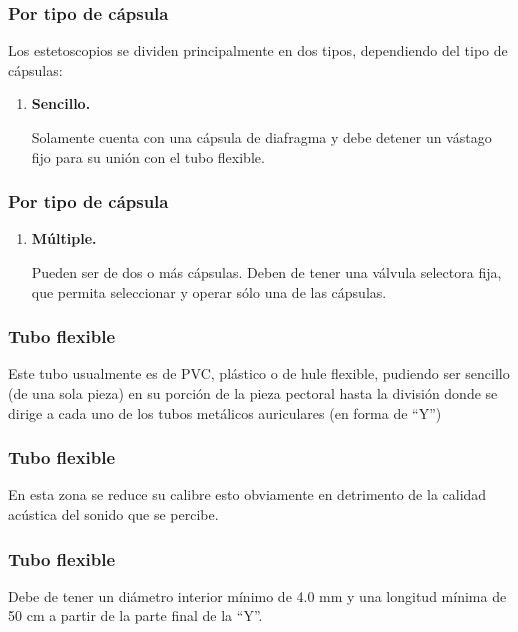\documentclass[14pt]{beamer}
\begin{document}
\begin{frame}
\frametitle{Por tipo de cápsula}
Los estetoscopios se dividen principalmente en dos tipos, dependiendo del tipo
de cápsulas:
\pause
{}
\begin{enumerate}[<+->]
\item \textbf{Sencillo.}

Solamente cuenta con una cápsula de diafragma y debe detener un vástago fijo para su unión con el tubo flexible.
\conti
\end{enumerate}
\end{frame}
\begin{frame}
\frametitle{Por tipo de cápsula}
\begin{enumerate}[<+->]
\conti
\item \textbf{Múltiple.}

Pueden ser de dos o más cápsulas. Deben de tener una válvula selectora fija, que permita seleccionar y operar sólo una de las cápsulas.    
\end{enumerate}
\end{frame}
\begin{frame}
\frametitle{Tubo flexible}
Este tubo usualmente es de PVC, plástico o de hule flexible, \pause pudiendo ser sencillo (de una sola pieza) en su porción de la pieza pectoral hasta la división donde se dirige a cada uno de los tubos metálicos auriculares (en forma de \enquote{Y})
\end{frame}
\begin{frame}
\frametitle{Tubo flexible}
En esta zona se reduce su calibre \pause esto obviamente en detrimento de la calidad acústica del sonido que se percibe.
\end{frame}
\begin{frame}
\frametitle{Tubo flexible}
Debe de tener un diámetro interior mínimo de 4.0 mm y una longitud mínima de 50 cm a partir de la parte final de la \enquote{Y}.
\end{frame}
\end{document}
